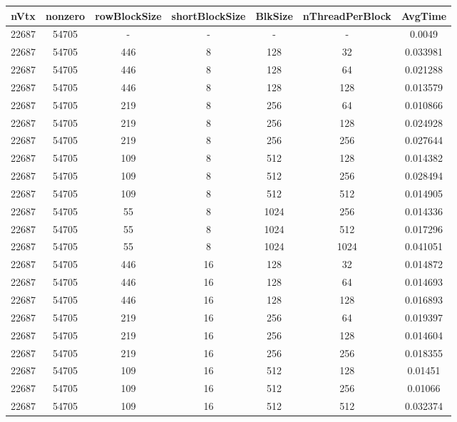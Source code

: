 \documentclass[9pt]{article}
\begin{document}
\SetBgPosition{0.25cm,-5.0cm}
\begin{tabular}{|c|c|c|c|c|c|c| }  
\hline
nVtx  & nonzero  & rowBlockSize  & shortBlockSize  & BlkSize  & nThreadPerBlock  & AvgTime \\
\hline
22687  & 54705  &  -  & -  & -  & -  &0.0049 \\
\hline
22687  & 54705  & 446  & 8  & 128  & 32  & 0.033981 \\
\hline
22687  & 54705  & 446  & 8  & 128  & 64  & 0.021288 \\
\hline
22687  & 54705  & 446  & 8  & 128  & 128  & 0.013579 \\
\hline
22687  & 54705  & 219  & 8  & 256  & 64  & 0.010866 \\
\hline
22687  & 54705  & 219  & 8  & 256  & 128  & 0.024928 \\
\hline
22687  & 54705  & 219  & 8  & 256  & 256  & 0.027644 \\
\hline
22687  & 54705  & 109  & 8  & 512  & 128  & 0.014382 \\
\hline
22687  & 54705  & 109  & 8  & 512  & 256  & 0.028494 \\
\hline
22687  & 54705  & 109  & 8  & 512  & 512  & 0.014905 \\
\hline
22687  & 54705  & 55  & 8  & 1024  & 256  & 0.014336 \\
\hline
22687  & 54705  & 55  & 8  & 1024  & 512  & 0.017296 \\
\hline
22687  & 54705  & 55  & 8  & 1024  & 1024  & 0.041051 \\
\hline
22687  & 54705  & 446  & 16  & 128  & 32  & 0.014872 \\
\hline
22687  & 54705  & 446  & 16  & 128  & 64  & 0.014693 \\
\hline
22687  & 54705  & 446  & 16  & 128  & 128  & 0.016893 \\
\hline
22687  & 54705  & 219  & 16  & 256  & 64  & 0.019397 \\
\hline
22687  & 54705  & 219  & 16  & 256  & 128  & 0.014604 \\
\hline
22687  & 54705  & 219  & 16  & 256  & 256  & 0.018355 \\
\hline
22687  & 54705  & 109  & 16  & 512  & 128  & 0.01451 \\
\hline
22687  & 54705  & 109  & 16  & 512  & 256  & 0.01066 \\
\hline
22687  & 54705  & 109  & 16  & 512  & 512  & 0.032374 \\

\end{tabular}
\end{document}
